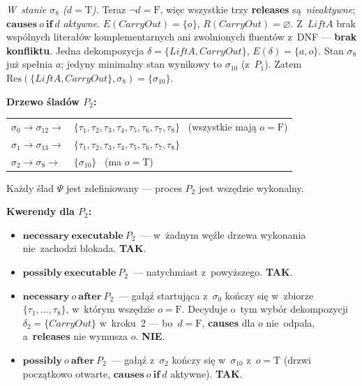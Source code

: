 \documentclass[11pt,a4paper]{article}
\newcommand{\causes}{\textbf{causes}}
\newcommand{\aft}{\textbf{after}}
\renewcommand{\iff}{\textbf{if}}
\newcommand{\releases}{\textbf{releases}}
\newcommand{\necessary}{\textbf{necessary}}
\newcommand{\possibly}{\textbf{possibly}}
\newcommand{\executable}{\textbf{executable}}
\theoremstyle{definition}
\begin{document}
\smallskip\noindent
\emph{W~stanie $\sigma_8$ ($d = \text{T}$).}
Teraz $\neg d = \text{F}$, więc wszystkie trzy \releases{} są~\emph{nieaktywne};
$\causes\ o\ \iff\ d$ \emph{aktywne}. $E(\mathit{CarryOut}) = \{o\}$,
$R(\mathit{CarryOut}) = \varnothing$. Z~$\mathit{LiftA}$ brak wspólnych literałów
komplementarnych ani zwolnionych fluentów z~DNF --- \textbf{brak konfliktu}.
Jedna dekompozycja $\delta = \{\mathit{LiftA}, \mathit{CarryOut}\}$,
$E(\delta) = \{a, o\}$. Stan $\sigma_8$ już spełnia $a$; jedyny minimalny stan
wynikowy to $\sigma_{10}$ (z~$P_1$). Zatem
$\mathrm{Res}(\{\mathit{LiftA}, \mathit{CarryOut}\}, \sigma_8) = \{\sigma_{10}\}$.

\medskip
\noindent\textbf{Drzewo śladów $P_2$:}
\begin{center}
\begin{tabular}{@{}l@{\ }l@{}}
$\sigma_0 \to \sigma_{12} \to$ & $\{\tau_1, \tau_2, \tau_3, \tau_4, \tau_5, \tau_6, \tau_7, \tau_8\}$
    \ (wszystkie mają $o = \text{F}$) \\
$\sigma_1 \to \sigma_{13} \to$ & $\{\tau_1, \tau_2, \tau_3, \tau_4, \tau_5, \tau_6, \tau_7, \tau_8\}$ \\
$\sigma_2 \to \sigma_{8} \to$  & $\{\sigma_{10}\}$
    \ (ma $o = \text{T}$) \\
\end{tabular}
\end{center}
Każdy ślad $\Psi$ jest zdefiniowany --- proces $P_2$ jest wszędzie wykonalny.

\medskip
\noindent\textbf{Kwerendy dla $P_2$:}
\begin{itemize}
  \item $\necessary\ \executable\ P_2$~---
    w~żadnym węźle drzewa wykonania nie~zachodzi blokada. \textbf{TAK}.

  \item $\possibly\ \executable\ P_2$~---
    natychmiast z~powyższego. \textbf{TAK}.

  \item $\necessary\ o\ \aft\ P_2$~---
    gałąź startująca z~$\sigma_0$ kończy się w~zbiorze $\{\tau_1, \ldots, \tau_8\}$,
    w~którym wszędzie $o = \text{F}$. Decyduje o~tym wybór dekompozycji
    $\delta_2 = \{\mathit{CarryOut}\}$ w~kroku~2 --- bo~$d = \text{F}$,
    \causes{} dla $o$ nie~odpala, a~\releases{} nie wymusza $o$. \textbf{NIE}.

  \item $\possibly\ o\ \aft\ P_2$~---
    gałąź z~$\sigma_2$ kończy się w~$\sigma_{10}$ z~$o = \text{T}$
    (drzwi początkowo otwarte, $\causes\ o\ \iff\ d$ aktywne). \textbf{TAK}.
\end{itemize}
\end{document}
